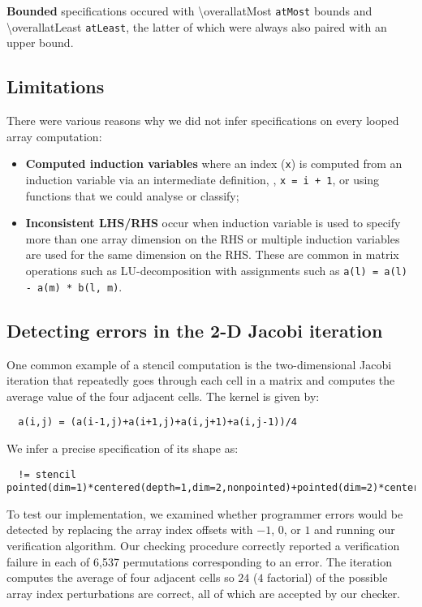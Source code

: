 \textbf{Bounded} specifications occured with \num{\overallatMost}
\texttt{atMost} bounds and \num{\overallatLeast} \texttt{atLeast}, the latter of which were
always also paired with an upper bound.



\subsection{Limitations}

\noindent
There were various reasons why we did not infer
specifications on every looped array computation:
\begin{itemize}
\item \textbf{Computed induction variables} where an
index (\texttt{x}) is computed from an
induction variable via an intermediate definition, \eg{}, 
\texttt{x = i + 1}, or using functions that
we could analyse or classify;

\item \textbf{Inconsistent LHS/RHS} occur when
induction variable is used to specify more than one array dimension
on the RHS or multiple induction variables are used for the same
dimension on the RHS. These are common in matrix operations such as
LU-decomposition with assignments such as
\texttt{a(l) = a(l) - a(m) * b(l, m)}.
\end{itemize}

\subsection{Detecting errors in the 2-D Jacobi iteration}
\label{sec:jacobi}

\noindent
One common example of a stencil computation is the two-dimensional
Jacobi iteration that repeatedly goes through each cell in a matrix
and computes the average value of the four adjacent cells. The kernel
is given by:
\begin{verbatim}
  a(i,j) = (a(i-1,j)+a(i+1,j)+a(i,j+1)+a(i,j-1))/4
\end{verbatim}
We infer a precise specification of its shape as:
\begin{verbatim}
  != stencil pointed(dim=1)*centered(depth=1,dim=2,nonpointed)+pointed(dim=2)*centered(depth=1,dim=1,nonpointed)
\end{verbatim}
%
To test our implementation,
we examined whether programmer errors would be detected by replacing
the array index offsets with $-1$, $0$, or $1$ and running our
verification algorithm. Our checking procedure correctly reported a verification
failure in each of 6,537 permutations corresponding to an error.
The iteration computes the average of four adjacent
cells so $24$ ($4$ factorial) of the possible array index perturbations
are correct, all of which are accepted by our checker.

